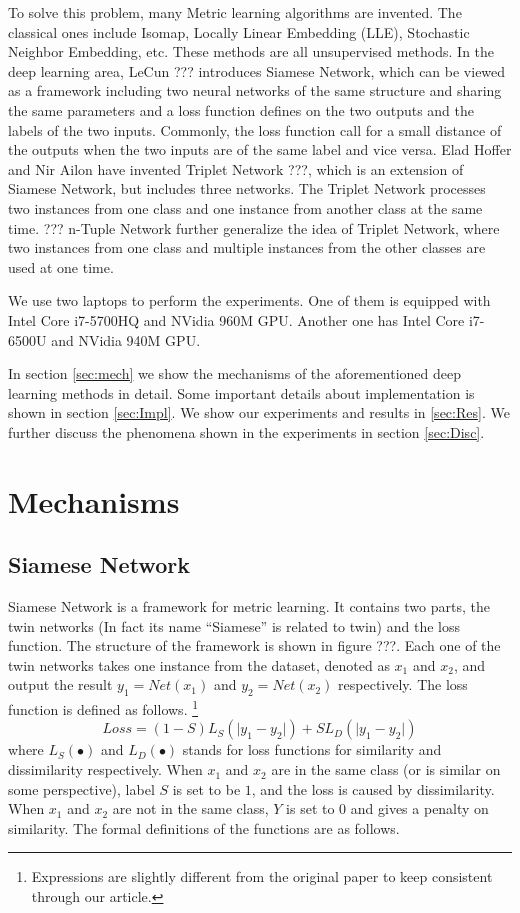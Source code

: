 \documentclass[10pt,twocolumn,letterpaper]{article}
\begin{document}
	To solve this problem, many Metric learning algorithms are invented. The classical ones include Isomap, Locally Linear Embedding (LLE), Stochastic Neighbor Embedding, etc. These methods are all unsupervised methods. In the deep learning area, LeCun ??? introduces Siamese Network, which can be viewed as a framework including two neural networks of the same structure and sharing the same parameters and a loss function defines on the two outputs and the labels of the two inputs. Commonly, the loss function call for a small distance of the outputs when the two inputs are of the same label and vice versa. Elad Hoffer and Nir Ailon have invented Triplet Network ???, which is an extension of Siamese Network, but includes three networks. The Triplet Network processes two instances from one class and one instance from another class at the same time. ??? n-Tuple Network further generalize the idea of Triplet Network, where two instances from one class and multiple instances from the other classes are used at one time.
	
	We use two laptops to perform the experiments. One of them is equipped with Intel Core i7-5700HQ and NVidia 960M GPU. Another one has Intel Core i7-6500U and 
	NVidia 940M GPU.

	In section \ref{sec:mech} we show the mechanisms of the aforementioned deep learning methods in detail. Some important details about implementation is shown in section \ref{sec:Impl}. We show our experiments and results in \ref{sec:Res}. We further discuss the phenomena shown in the experiments in section \ref{sec:Disc}.
	
	\section{Mechanisms \label{sec:mech}}
		\subsection{Siamese Network}
			Siamese Network is a framework for metric learning. It contains two parts, the twin networks (In fact its name ``Siamese'' is related to twin) and the loss function. The structure of the framework is shown in figure ???. Each one of the twin networks takes one instance from the dataset, denoted as $x_1$ and $x_2$, and output the result $y_1 = Net(x_1)$ and $y_2 = Net(x_2)$ respectively. The loss function is defined as follows. \footnote{Expressions are slightly different from the original paper to keep consistent through our article.}
			\begin{equation}
				Loss = (1-S)L_S(\lvert y_1 - y_2 \rvert) + S L_D(\lvert y_1 - y_2 \rvert)
			\end{equation}
			where $L_S(\bullet)$ and $L_D(\bullet)$ stands for loss functions for similarity and dissimilarity respectively. When $x_1$ and $x_2$ are in the same class (or is similar on some perspective), label $S$ is set to be $1$, and the loss is caused by dissimilarity. When $x_1$ and $x_2$ are not in the same class, $Y$ is set to $0$ and gives a penalty on similarity. The formal definitions of the functions are as follows.
\end{document}
